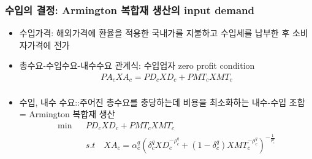 \documentclass[10pt,compress,slidetop,%
			   hyperref={unicode},xcolor={svgnames},%
			   t]{beamer}
\begin{document}
\begin{frame}
	\frametitle{수입의 결정: Armington 복합재 생산의 input demand }

\begin{itemize}
	\item{수입가격: 해외가격에 환율을 적용한 국내가를 지불하고 수입세를 납부한 후 소비자가격에 전가}
	\item{총수요-수입수요-내수수요 관계식: 수입업자 zero profit condition}
	\begin{eqnarray*}
 		PA_cXA_c=PD_cXD_c +PMT_cXMT_c\\
	\end{eqnarray*}	
	\item{수입, 내수 수요::주어진 총수요를 충당하는데 비용을 최소화하는 내수-수입 조합 = Armington 복합재 생산}
	\begin{eqnarray*}
 		\min& &PD_cXD_c +PMT_cXMT_c\\
    		& & s.t\quad XA_c=\alpha^{q}_{c}(\delta^{q}_c XD^{-\rho^{q}_c}_c + (1-\delta^{q}_c)XMT^{-\rho^{q}_c}_c)^{-\frac{1}{\rho^{q}_c}}\\
	\end{eqnarray*}
\end{itemize}
\end{frame}
\end{document}
